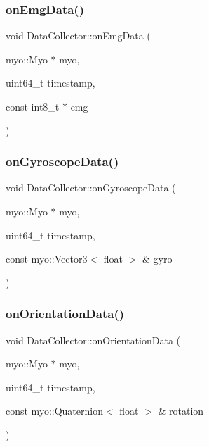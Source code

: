 \mbox{\label{class_data_collector_a43639de09ccb9c540a3d21d267e7460a}} 
\subsubsection{on\+Emg\+Data()}
{\footnotesize\ttfamily void Data\+Collector\+::on\+Emg\+Data (\begin{DoxyParamCaption}\item[{myo\+::\+Myo $\ast$}]{myo,  }\item[{uint64\+\_\+t}]{timestamp,  }\item[{const int8\+\_\+t $\ast$}]{emg }\end{DoxyParamCaption})}

\mbox{\label{class_data_collector_a46ee5fda02554a8d84a0f449026dcfac}} 
\subsubsection{on\+Gyroscope\+Data()}
{\footnotesize\ttfamily void Data\+Collector\+::on\+Gyroscope\+Data (\begin{DoxyParamCaption}\item[{myo\+::\+Myo $\ast$}]{myo,  }\item[{uint64\+\_\+t}]{timestamp,  }\item[{const myo\+::\+Vector3$<$ float $>$ \&}]{gyro }\end{DoxyParamCaption})}

\mbox{\label{class_data_collector_a7e54df882eed064e4059b3361dff796f}} 
\subsubsection{on\+Orientation\+Data()}
{\footnotesize\ttfamily void Data\+Collector\+::on\+Orientation\+Data (\begin{DoxyParamCaption}\item[{myo\+::\+Myo $\ast$}]{myo,  }\item[{uint64\+\_\+t}]{timestamp,  }\item[{const myo\+::\+Quaternion$<$ float $>$ \&}]{rotation }\end{DoxyParamCaption})}

